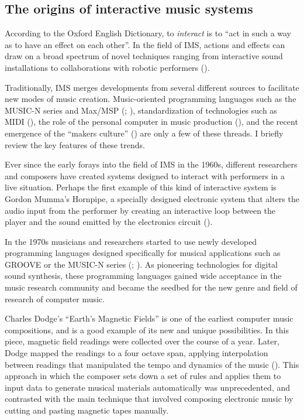 \documentclass[a4paper,11pt]{article}
\begin{document}
\subsection{The origins of interactive music systems} \label{literature:ims}

According to the Oxford English Dictionary, to \emph{interact} is to ``act in such a way as to have an effect on each other''.
In the field of IMS, actions and effects can draw on a broad spectrum of novel techniques ranging from interactive sound installations to collaborations with robotic performers (\cite{drummond09}).

Traditionally, IMS merges developments from several different sources to facilitate new modes of music creation.
Music-oriented programming languages such as the MUSIC-N series and Max/MSP (\cite{mathews69}; \cite[p. 16]{winkler01}), standardization of technologies such as MIDI (\cite{web:quinn}), the role of the personal computer in music production (\cite{leider:04}), and the recent emergence of the ``makers culture'' (\cite{kuznetsov2010rise}) are only a few of these threads.
I briefly review the key features of these trends.

Ever since the early forays into the field of IMS in the 1960s, different researchers and composers have created systems designed to interact with performers in a live situation.
Perhaps the first example of this kind of interactive system is Gordon Mumma's Hornpipe, a specially designed electronic system that alters the audio input from the performer by creating an interactive loop between the player and the sound emitted by the electronics circuit (\cite[p. 12]{winkler01}).

In the 1970s musicians and researchers started to use newly developed programming languages designed specifically for musical applications such as GROOVE or the MUSIC-N series (\cite{mathews70}; \cite{mathews69}).
As pioneering technologies for digital sound synthesis, these programming languages gained wide acceptance in the music research community and became the seedbed for the new genre and field of research of computer music.

Charles Dodge's ``Earth's Magnetic Fields'' is one of the earliest computer music compositions, and is a good example of its new and unique possibilities.
In this piece, magnetic field readings were collected over the course of a year.
Later, Dodge mapped the readings to a four octave span, applying interpolation between readings that manipulated the tempo and dynamics of the music (\cite{scriptsgrooves14}).
This approach in which the composer sets down a set of rules and applies them to input data to generate musical materials automatically was unprecedented, and contrasted with the main technique that involved composing electronic music by cutting and pasting magnetic tapes manually.
\end{document}

